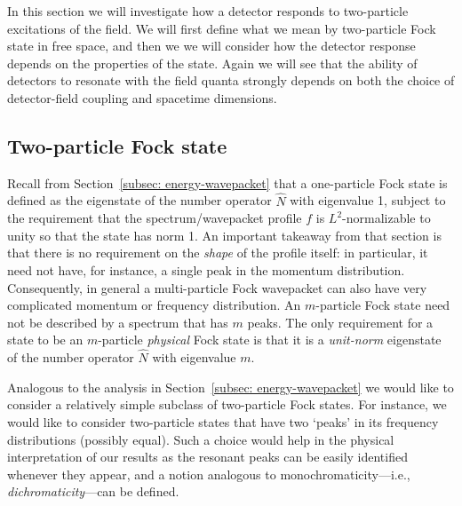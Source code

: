 \documentclass[prd,twocolumn,superscriptaddress,nofootinbib,floatfix,amsmath,amssymb]{revtex4-2}
\begin{document}
    In this section we will investigate how a detector responds to two-particle excitations of the field. We will first define what we mean by two-particle Fock state in free space, and then we we will consider how the detector response depends on the properties of the state. Again we will see that the ability of detectors to resonate with the field quanta strongly depends on both the choice of detector-field coupling and spacetime dimensions.

    
    
    \subsection{Two-particle Fock state}
    \label{subsec: two-particle-state-def}
    

    
    Recall from Section~\ref{subsec: energy-wavepacket} that a one-particle Fock state is defined as the eigenstate of the number operator $\hat N$ with eigenvalue 1, subject to the requirement that the spectrum/wavepacket profile $f$ is $L^2$-normalizable to unity so that the state has norm 1. An important takeaway from that section is that there is no requirement on the \textit{shape} of the profile itself: in particular, it need not have, for instance, a single peak in the momentum distribution. Consequently, in general a multi-particle Fock wavepacket can also have very complicated momentum or frequency distribution. An $m$-particle Fock state need not be described by a spectrum that has $m$ peaks. The only requirement for a state to be an $m$-particle \textit{physical} Fock state is that it is a \textit{unit-norm} eigenstate of the number operator $\hat N$ with eigenvalue $m$. 
    
    Analogous to the analysis in Section~\ref{subsec: energy-wavepacket} we would like to consider a relatively simple subclass of two-particle Fock states. For instance, we would like to consider two-particle states that have two `peaks' in its frequency distributions (possibly equal). Such a choice would help in the physical interpretation of our results as the resonant peaks can be easily identified whenever they appear, and a notion analogous to monochromaticity---i.e., \textit{dichromaticity}---can be defined. %
    
\end{document}
